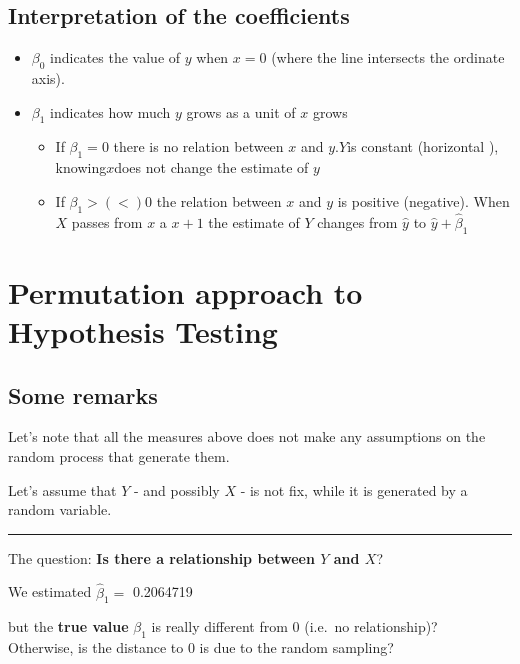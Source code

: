 \documentclass[]{article}
\providecommand{\tightlist}{%
  \setlength{\itemsep}{0pt}\setlength{\parskip}{0pt}}
\begin{document}
\subsection{Interpretation of the
coefficients}\label{interpretation-of-the-coefficients}

\begin{itemize}
\tightlist
\item
  \(\beta_0\) indicates the value of \(y\) when \(x=0\) (where the line
  intersects the ordinate axis).
\item
  \(\beta_1\) indicates how much \(y\) grows as a unit of \(x\) grows

  \begin{itemize}
  \tightlist
  \item
    If \(\beta_1=0\) there is no relation between \(x\) and
    \(y\).\(Y\)is constant (horizontal ), knowing\(x\)does not change
    the estimate of \(y\)
  \item
    If \(\beta_1> (<) 0\) the relation between \(x\) and \(y\) is
    positive (negative). When \(X\) passes from \(x\) a \(x + 1\) the
    estimate of \(Y\) changes from \(\hat{y}\) to
    \(\hat{y} + \hat{\beta}_1\)
  \end{itemize}
\end{itemize}

\section{Permutation approach to Hypothesis
Testing}\label{permutation-approach-to-hypothesis-testing}

\subsection{Some remarks}\label{some-remarks}

Let's note that all the measures above does not make any assumptions on
the random process that generate them.

Let's assume that \(Y\) - and possibly \(X\) - is not fix, while it is
generated by a random variable.

\begin{center}\rule{0.5\linewidth}{\linethickness}\end{center}

The question: \textbf{Is there a relationship between \(Y\) and \(X\)}?

We estimated \(\hat{\beta}_1=\) 0.2064719

but the \textbf{true value} \(\beta_1\) is really different from 0
(i.e.~no relationship)?\\
Otherwise, is the distance to 0 is due to the random sampling?
\end{document}
